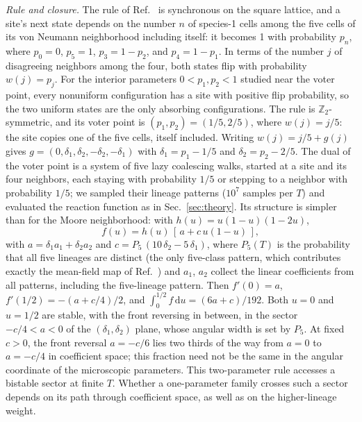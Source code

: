 \documentclass[pre,twocolumn,superscriptaddress,showpacs,floatfix]{revtex4-2}
\newcommand{\ds}{\mathrm{d}}
\begin{document}
\textit{Rule and closure.} The rule of Ref.~\cite{molofsky1999} is synchronous on the square
lattice, and a site's next state depends on the number $n$ of species-1 cells among the five
cells of its von Neumann neighborhood including itself: it becomes 1 with probability $p_n$,
where $p_0 = 0$, $p_5 = 1$, $p_3 = 1-p_2$, and $p_4 = 1-p_1$. In terms of the number $j$ of
disagreeing neighbors among the four, both states flip with probability $w(j) = p_j$.
For the interior parameters $0<p_1,p_2<1$ studied near the voter point, every
nonuniform configuration has a site with positive flip probability, so the two
uniform states are the only absorbing configurations. The rule is
$\mathbb{Z}_2$-symmetric, and its voter point is
$(p_1,p_2) = (1/5,2/5)$, where $w(j) = j/5$: the site copies one of the five cells, itself
included. Writing $w(j) = j/5 + g(j)$ gives $g = (0,\delta_1,\delta_2,-\delta_2,-\delta_1)$ with
$\delta_1 = p_1 - 1/5$ and $\delta_2 = p_2 - 2/5$. The dual of the voter point is a system of
five lazy coalescing walks, started at a site and its four neighbors, each staying with
probability $1/5$ or stepping to a neighbor with probability $1/5$; we sampled their lineage
patterns ($10^7$ samples per $T$) and evaluated the reaction function as in
Sec.~\ref{sec:theory}. Its structure is simpler than for the Moore neighborhood: with
$h(u) = u(1-u)(1-2u)$,
\begin{equation}
f(u) = h(u)\,[\,a + c\,u(1-u)\,],
\label{eq:fmol}
\end{equation}
with $a = \delta_1 a_1 + \delta_2 a_2$ and $c = P_5\,(10\,\delta_2 - 5\,\delta_1)$, where
$P_5(T)$ is the probability that all five lineages are distinct (the only five-class pattern,
which contributes exactly the mean-field map of Ref.~\cite{molofsky1999}) and $a_1$, $a_2$
collect the linear coefficients from all patterns, including the five-lineage
pattern. Then $f'(0) = a$, $f'(1/2) = -(a + c/4)/2$, and
$\int_0^{1/2} f\,\ds u = (6a+c)/192$. Both $u = 0$ and $u = 1/2$ are stable, with the front
reversing in between, in the sector $-c/4 < a < 0$ of the $(\delta_1,\delta_2)$ plane, whose
angular width is set by $P_5$. At fixed $c>0$, the front reversal $a=-c/6$
lies two thirds of the way from $a=0$ to $a=-c/4$ in coefficient space;
this fraction need not be the same in the angular coordinate of the microscopic
parameters. This two-parameter rule accesses a bistable sector at finite $T$.
Whether a one-parameter family crosses such a sector depends on its path through
coefficient space, as well as on the higher-lineage weight.
\end{document}
